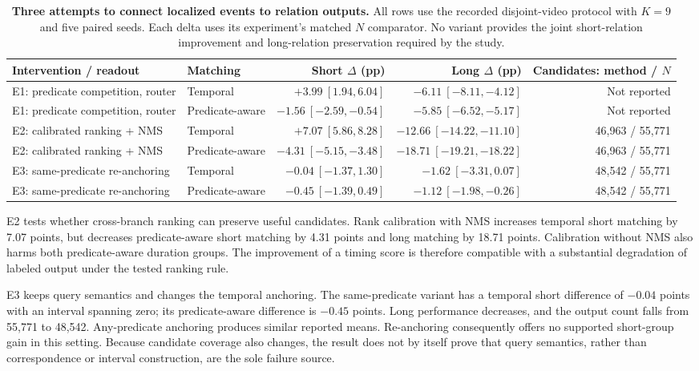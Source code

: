 \documentclass[10pt,twocolumn,letterpaper]{article}
\begin{document}
\begin{table}[t]
\centering\small
\setlength{\tabcolsep}{5pt}
\begin{tabular}{llrrr}
\toprule
Intervention / readout & Matching & Short $\Delta$ (pp) & Long $\Delta$ (pp) & Candidates: method / $N$\\
\midrule
E1: predicate competition, router & Temporal & $+3.99\ [1.94,6.04]$ & $-6.11\ [-8.11,-4.12]$ & Not reported\\
E1: predicate competition, router & Predicate-aware & $-1.56\ [-2.59,-0.54]$ & $-5.85\ [-6.52,-5.17]$ & Not reported\\
\midrule
E2: calibrated ranking + NMS & Temporal & $+7.07\ [5.86,8.28]$ & $-12.66\ [-14.22,-11.10]$ & 46,963 / 55,771\\
E2: calibrated ranking + NMS & Predicate-aware & $-4.31\ [-5.15,-3.48]$ & $-18.71\ [-19.21,-18.22]$ & 46,963 / 55,771\\
\midrule
E3: same-predicate re-anchoring & Temporal & $-0.04\ [-1.37,1.30]$ & $-1.62\ [-3.31,0.07]$ & 48,542 / 55,771\\
E3: same-predicate re-anchoring & Predicate-aware & $-0.45\ [-1.39,0.49]$ & $-1.12\ [-1.98,-0.26]$ & 48,542 / 55,771\\
\bottomrule
\end{tabular}
\caption{\textbf{Three attempts to connect localized events to relation outputs.} All rows use the recorded disjoint-video protocol with $K=9$ and five paired seeds. Each delta uses its experiment's matched $N$ comparator. No variant provides the joint short-relation improvement and long-relation preservation required by the study.}
\label{tab:interventions}
\end{table}

E2 tests whether cross-branch ranking can preserve useful candidates. Rank calibration with NMS increases temporal short matching by 7.07 points, but decreases predicate-aware short matching by 4.31 points and long matching by 18.71 points. Calibration without NMS also harms both predicate-aware duration groups. The improvement of a timing score is therefore compatible with a substantial degradation of labeled output under the tested ranking rule.

E3 keeps query semantics and changes the temporal anchoring. The same-predicate variant has a temporal short difference of $-0.04$ points with an interval spanning zero; its predicate-aware difference is $-0.45$ points. Long performance decreases, and the output count falls from 55,771 to 48,542. Any-predicate anchoring produces similar reported means. Re-anchoring consequently offers no supported short-group gain in this setting. Because candidate coverage also changes, the result does not by itself prove that query semantics, rather than correspondence or interval construction, are the sole failure source.
\end{document}
